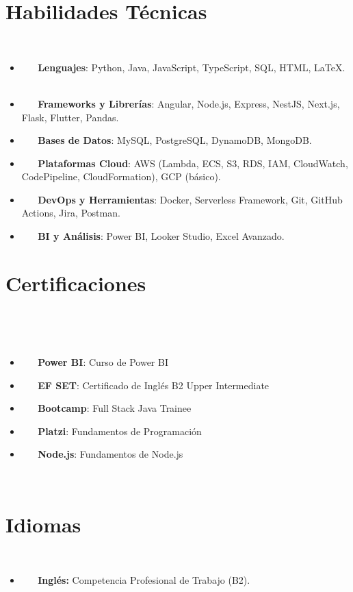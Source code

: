 \documentclass[letterpaper,11pt]{article}
\newcommand{\resumeItem}[2]{
  \item\small{
    \textbf{#1}{#2 \vspace{-2pt}}
  }
}
\newcommand{\resumeSubItem}[2]{\resumeItem{#1}{#2}\vspace{-4pt}}
\newcommand{\resumeSubItemcol}[2]{\resumeItem{#1}{#2}\vspace{-8pt}}
\newcommand{\resumeSubHeadingListStart}{\begin{itemize}[leftmargin=*]}
\newcommand{\resumeSubHeadingListEnd}{\end{itemize}}
\begin{document}
\section{Habilidades Técnicas}
 \resumeSubHeadingListStart
 \resumeSubItem{}{\textbf{Lenguajes}{: Python, Java, JavaScript, TypeScript, SQL, HTML, LaTeX.}}
 \resumeSubItem{}{\textbf{Frameworks y Librerías}{: Angular, Node.js, Express, NestJS, Next.js, Flask, Flutter, Pandas.}}
 \resumeSubItem{}{\textbf{Bases de Datos}{: MySQL, PostgreSQL, DynamoDB, MongoDB.}}
 \resumeSubItem{}{\textbf{Plataformas Cloud}{: AWS (Lambda, ECS, S3, RDS, IAM, CloudWatch, CodePipeline, CloudFormation), GCP (básico).}}
 \resumeSubItem{}{\textbf{DevOps y Herramientas}{: Docker, Serverless Framework, Git, GitHub Actions, Jira, Postman.}}
 \resumeSubItem{}{\textbf{BI y Análisis}{: Power BI, Looker Studio, Excel Avanzado.}}
 \resumeSubHeadingListEnd

\section{Certificaciones}
\vspace{-15pt}
  \begin{multicols}{2}
    \resumeSubHeadingListStart
    \resumeSubItemcol{Power BI}{: Curso de Power BI}
    \resumeSubItemcol{EF SET}{: Certificado de Inglés B2 Upper Intermediate}
    \resumeSubItemcol{Bootcamp}{: Full Stack Java Trainee}
    \resumeSubItemcol{Platzi}{: Fundamentos de Programación}
    \resumeSubItemcol{Node.js}{: Fundamentos de Node.js}
  \resumeSubHeadingListEnd
  \end{multicols}

\section{Idiomas}
 \resumeSubHeadingListStart
 \resumeSubItem{}{\textbf{Inglés:} Competencia Profesional de Trabajo (B2).}
 \resumeSubHeadingListEnd
\end{document}

